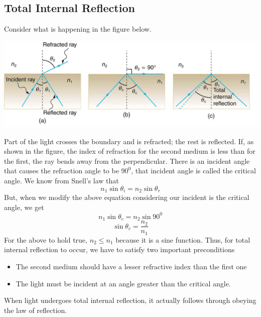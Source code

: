 \documentclass[11pt]{article}
\begin{document}
	\subsection*{Total Internal Reflection}
	Consider what is happening in the figure below.
	\begin{center}
		\includegraphics[scale=0.5]{tir}
	\end{center}
	Part of the light crosses the boundary and is refracted; the rest is reflected. If, as shown in the figure, the index of refraction for the second medium is less than for the first, the ray bends away from the perpendicular. There is an incident angle that causes the refraction angle to be $90^0$, that incident angle is called the critical angle. We know from Snell's law that
	$$n_{1} \sin \theta_{i} = n_{2} \sin \theta_{r}$$
	But, when we modify the above equation considering our incident is the critical angle, we get
	$$n_{1} \sin \theta_{c} = n_{2} \sin 90^0$$
	$$\sin\theta_{c}=\dfrac{n_2}{n_1}$$
	For the above to hold true, $n_2\le n_1$ because it is a sine function. Thus, for total internal reflection to occur, we have to satisfy two important preconditions
	\begin{itemize}
		\item The second medium should have a lesser refractive index than the first one
		\item The light must be incident at an angle greater than the critical angle.
	\end{itemize}
	When light undergoes total internal reflection, it actually follows through obeying the law of reflection.
\end{document}
